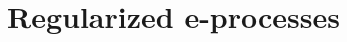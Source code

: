 \documentclass[a4paper, 12pt]{article}
\theoremstyle{plain}
\theoremstyle{definition}
\theoremstyle{remark}
\begin{document}











\section{Regularized e-processes}
\label{S:reg.eprocess}

%
%
\end{document}
